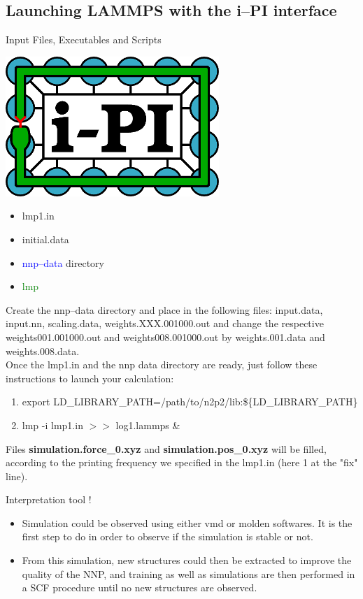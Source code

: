 \documentclass[12pt]{article}
\begin{document}
\subsection{Launching LAMMPS with the i--PI interface}
\begin{mybox2}{{Input Files, Executables and Scripts}}
\begin{minipage}[c]{0.5\linewidth}
\includegraphics[scale=0.35]{ipi-logo-alpha.png}
\end{minipage}
\begin{minipage}[c]{0.5\linewidth}
\begin{itemize}
    \item lmp1.in
    \item initial.data
    \item \textcolor{blue}{nnp--data} directory
    \item \textcolor{green}{lmp}
\end{itemize}
\end{minipage}
\end{mybox2}
Create the nnp--data directory and place in the following files: input.data, input.nn, scaling.data, weights.XXX.001000.out and change the respective weights001.001000.out and weights008.001000.out by weights.001.data and weights.008.data. \\
Once the lmp1.in and the nnp data directory are ready, just follow these instructions to launch your calculation:
\begin{enumerate}
    \item export LD\_LIBRARY\_PATH=/path/to/n2p2/lib:\$\{LD\_LIBRARY\_PATH\}
    \item lmp -i lmp1.in $>>$ log1.lammps \&
\end{enumerate}
Files \textbf{simulation.force\_0.xyz} and \textbf{simulation.pos\_0.xyz} will be filled, according to the printing frequency we specified in the lmp1.in (here 1 at the "fix" line).
\\
\begin{mybox1}{Interpretation tool !}
\begin{itemize}
    \item Simulation could be observed using either vmd or molden softwares. It is the first step to do in order to observe if the simulation is stable or not.
    \item From this simulation, new structures could then be extracted to improve the quality of the NNP, and training as well as simulations are then performed in a SCF procedure until no new structures are observed.
\end{itemize}
\end{mybox1}
%
\end{document}
